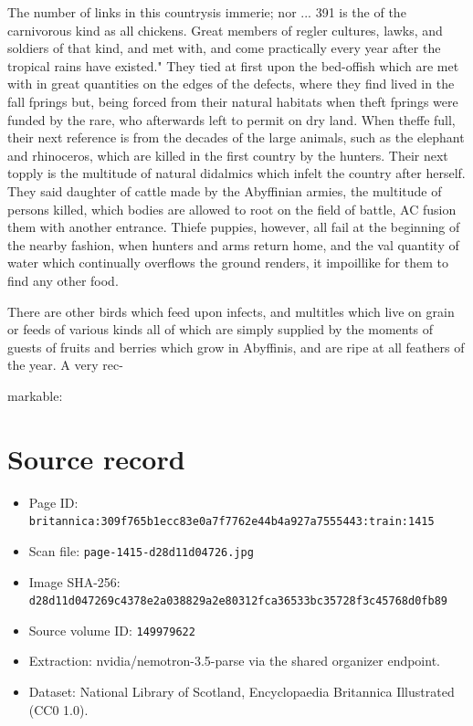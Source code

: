 \documentclass{article}
\begin{document}
The number of links in this countrysis immerie; nor ... 391 is the of the carnivorous kind as all chickens. Great members of regler cultures, lawks, and soldiers of that kind, and met with, and come practically every year after the tropical rains have existed." They tied at first upon the bed-offish which are met with in great quantities on the edges of the defects, where they find lived in the fall fprings but, being forced from their natural habitats when theft fprings were funded by the rare, who afterwards left to permit on dry land. When theffe full, their next reference is from the decades of the large animals, such as the elephant and rhinoceros, which are killed in the first country by the hunters. Their next topply is the multitude of natural didalmics which infelt the country after herself. They said daughter of cattle made by the Abyffinian armies, the multitude of persons killed, which bodies are allowed to root on the field of battle, AC fusion them with another entrance. Thiefe puppies, however, all fail at the beginning of the nearby fashion, when hunters and arms return home, and the val quantity of water which continually overflows the ground renders, it impoillike for them to find any other food.

There are other birds which feed upon infects, and multitles which live on grain or feeds of various kinds all of which are simply supplied by the moments of guests of fruits and berries which grow in Abyffinis, and are ripe at all feathers of the year. A very rec-

markable:

\section*{Source record}
\begin{itemize}
\item Page ID: \texttt{britannica:309f765b1ecc83e0a7f7762e44b4a927a7555443:train:1415}
\item Scan file: \texttt{page-1415-d28d11d04726.jpg}
\item Image SHA-256: \texttt{d28d11d047269c4378e2a038829a2e80312fca36533bc35728f3c45768d0fb89}
\item Source volume ID: \texttt{149979622}
\item Extraction: nvidia/nemotron-3.5-parse via the shared organizer endpoint.
\item Dataset: National Library of Scotland, Encyclopaedia Britannica Illustrated (CC0 1.0).
\end{itemize}
\end{document}
